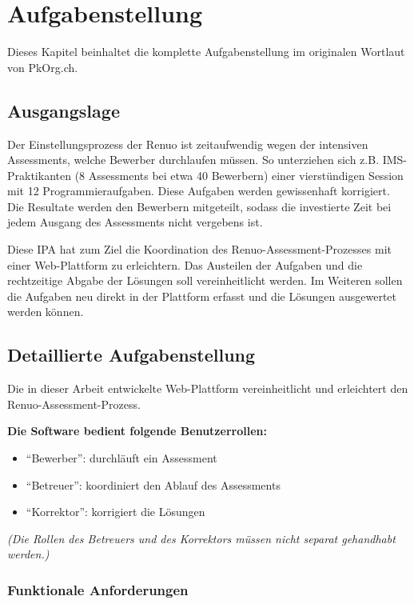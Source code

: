 \chapter{Aufgabenstellung}

Dieses Kapitel beinhaltet die komplette Aufgabenstellung im originalen Wortlaut von PkOrg.ch.

\section{Ausgangslage}

Der Einstellungsprozess der Renuo ist zeitaufwendig wegen der intensiven Assessments, welche Bewerber
durchlaufen müssen. So unterziehen sich z.B. IMS-Praktikanten (8 Assessments bei etwa 40 Bewerbern) einer
vierstündigen Session mit 12 Programmieraufgaben. Diese Aufgaben werden gewissenhaft korrigiert. Die
Resultate werden den Bewerbern mitgeteilt, sodass die investierte Zeit bei jedem Ausgang des Assessments
nicht vergebens ist.

Diese IPA hat zum Ziel die Koordination des Renuo-Assessment-Prozesses mit einer Web-Plattform zu
erleichtern. Das Austeilen der Aufgaben und die rechtzeitige Abgabe der Lösungen soll vereinheitlicht werden.
Im Weiteren sollen die Aufgaben neu direkt in der Plattform erfasst und die Lösungen ausgewertet werden
können.

\section{Detaillierte Aufgabenstellung}

Die in dieser Arbeit entwickelte Web-Plattform vereinheitlicht und erleichtert den Renuo-Assessment-Prozess.

\textbf{Die Software bedient folgende Benutzerrollen:}
\begin{itemize}
    \item \enquote{Bewerber}: durchläuft ein Assessment
    \item \enquote{Betreuer}: koordiniert den Ablauf des Assessments
    \item \enquote{Korrektor}: korrigiert die Lösungen
\end{itemize}

\emph{(Die Rollen des Betreuers und des Korrektors müssen nicht separat gehandhabt werden.)}

\newpage

\subsection{Funktionale Anforderungen}

